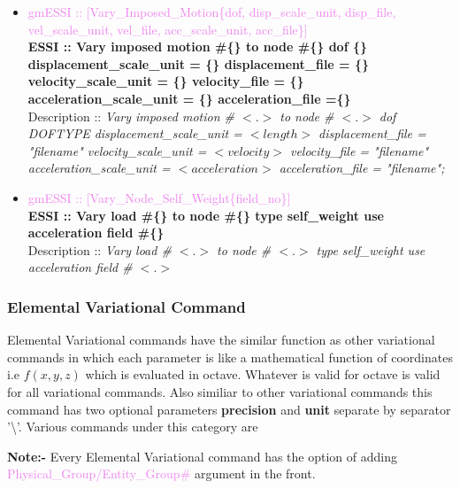 \documentclass[11pt]{article}
\begin{document}
\begin{itemize}
  \item \textcolor{violet}{ gmESSI :: [Vary\_Imposed\_Motion\{dof, disp\_scale\_unit, disp\_file, vel\_scale\_unit, vel\_file, acc\_scale\_unit, acc\_file\}]}\\
  \textbf{ ESSI :: Vary imposed motion \#\{\} to node \#\{\} dof \{\} displacement\_scale\_unit = \{\} displacement\_file = \{\} velocity\_scale\_unit = \{\} velocity\_file = \{\} acceleration\_scale\_unit = \{\} acceleration\_file =\{\}}\\
  Description :: \textit{Vary imposed motion \# $<.>$ to node \# $<.>$ dof DOFTYPE displacement\_scale\_unit = $<length>$ displacement\_file = "filename" velocity\_scale\_unit = $<velocity>$ velocity\_file = "filename" acceleration\_scale\_unit = $<acceleration>$ acceleration\_file = "filename";}

  \item \textcolor{violet}{ gmESSI :: [Vary\_Node\_Self\_Weight\{field\_no\}]}\\
  \textbf{ ESSI :: Vary load \#\{\} to node \#\{\} type self\_weight use acceleration field \#\{\} }\\
  Description :: \textit{Vary load \# $<.>$ to node \# $<.>$ type self\_weight use acceleration field \# $<.>$}

\end{itemize}


\subsubsection{Elemental Variational Command}
Elemental Variational commands have the similar function as other variational commands
in which each parameter is like a mathematical function of coordinates i.e $f(x,y,z)$ 
which is evaluated in octave. Whatever is valid for octave is valid for all variational 
commands. Also similiar to other variational commands 
this command has two optional parameters \textbf{precision} and \textbf{unit} separate 
by separator '\textbackslash'. Various commands under this category are 

\noindent \textbf{Note:-} Every Elemental Variational command has the option of adding
\textcolor{violet}{Physical_Group/Entity_Group\#} argument in the front.
\end{document}
